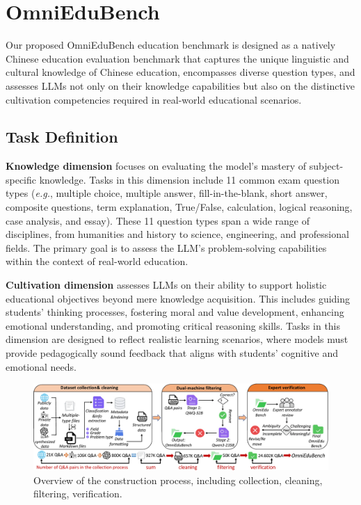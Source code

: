 \section{OmniEduBench}

Our proposed OmniEduBench education benchmark is designed as a \textcolor{myorange}{natively Chinese education evaluation benchmark} that captures the unique linguistic and cultural knowledge of Chinese education, encompasses diverse question types, and assesses LLMs not only on their knowledge capabilities but also on the distinctive cultivation competencies required in real-world educational scenarios. 

\subsection{Task Definition}

\textbf{Knowledge dimension} focuses on evaluating the model’s mastery of subject-specific knowledge. Tasks in this dimension include 11 common exam question types (\textit{e.g.}, multiple choice, multiple answer, fill-in-the-blank, short answer, composite questions, term explanation, True/False, calculation, logical reasoning, case analysis, and essay). These 11 question types span a wide range of disciplines, from humanities and history to science, engineering, and professional fields. The primary goal is to assess the LLM’s problem-solving capabilities within the context of real-world education. 

\textbf{Cultivation dimension} assesses LLMs on their ability to support holistic educational objectives beyond mere knowledge acquisition. This includes guiding students’ thinking processes, fostering moral and value development, enhancing emotional understanding, and promoting critical reasoning skills. Tasks in this dimension are designed to reflect realistic learning scenarios, where models must provide pedagogically sound feedback that aligns with students’ cognitive and emotional needs.

\begin{figure}[tbp]
    \centering
    \includegraphics[height=0.3\textwidth]{figure/omniprocess.pdf}
    \vspace{-6mm}
    \caption{Overview of the construction process, including collection, cleaning, filtering, verification.}
    \label{fig:omniprocess}
    \vspace{-5mm}
\end{figure}

